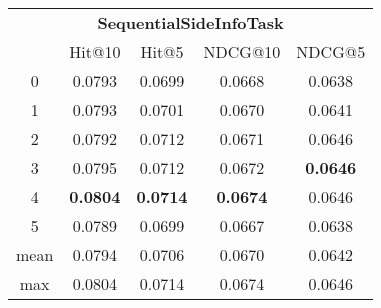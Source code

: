 \documentclass{article}
\begin{document}
 

\begin{tabular}{c|cccc}

\multicolumn{5}{c}{\textbf{SequentialSideInfoTask}} \\
\noalign{\smallskip}
\noalign{\smallskip}
\toprule
\multicolumn{1}{c}{Template ID} & \multicolumn{1}{|c}{Hit@10} & \multicolumn{1}{c}{Hit@5} & \multicolumn{1}{c}{NDCG@10} & \multicolumn{1}{c}{NDCG@5} \\
\midrule
0 & 0.0793 & 0.0699 & 0.0668 & 0.0638 \\
1 & 0.0793 & 0.0701 & 0.0670 & 0.0641 \\
2 & 0.0792 & 0.0712 & 0.0671 & 0.0646 \\
3 & 0.0795 & 0.0712 & 0.0672 & \textbf{0.0646} \\
4 & \textbf{0.0804} & \textbf{0.0714} & \textbf{0.0674} & 0.0646 \\
5 & 0.0789 & 0.0699 & 0.0667 & 0.0638 \\
\midrule
mean & 0.0794 & 0.0706 & 0.0670 & 0.0642 \\
max & 0.0804 & 0.0714 & 0.0674 & 0.0646 \\
\bottomrule

\end{tabular}
\end{document}

